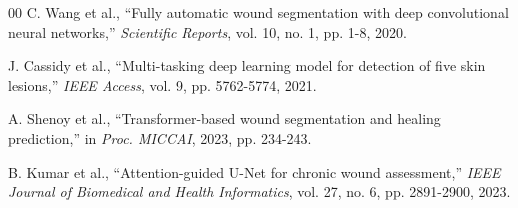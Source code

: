 \documentclass[conference]{IEEEtran}
\begin{document}
\begin{thebibliography}{00}
C. Wang et al., ``Fully automatic wound segmentation with deep convolutional neural networks,'' \textit{Scientific Reports}, vol. 10, no. 1, pp. 1-8, 2020.

J. Cassidy et al., ``Multi-tasking deep learning model for detection of five skin lesions,'' \textit{IEEE Access}, vol. 9, pp. 5762-5774, 2021.

A. Shenoy et al., ``Transformer-based wound segmentation and healing prediction,'' in \textit{Proc. MICCAI}, 2023, pp. 234-243.

B. Kumar et al., ``Attention-guided U-Net for chronic wound assessment,'' \textit{IEEE Journal of Biomedical and Health Informatics}, vol. 27, no. 6, pp. 2891-2900, 2023.

\end{thebibliography}
\end{document}

